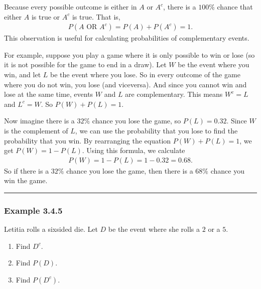 \documentclass[letterpaper,10pt,english]{jupyterBook}
\begin{document}
\sphinxAtStartPar
Because every possible outcome is either in \(A\) or \(A^c\), there is a \(100\%\) chance that either \(A\) is true or \(A^c\) is true. That is,
\begin{equation*}
\begin{split} P(A \text{ OR } A^c) = P(A) + P(A^c) = 1. \end{split}
\end{equation*}
\sphinxAtStartPar
This observation is useful for calculating probabilities of complementary events.

\sphinxAtStartPar
For example, suppose you play a game where it is only possible to win or lose (so it is not possible for the game to end in a draw). Let \(W\) be the event where you win, and let \(L\) be the event where you lose. So in every outcome of the game where you do not win, you lose (and vice\sphinxhyphen{}versa). And since you cannot win and lose at the same time, events \(W\) and \(L\) are complementary. This means \(W^c = L\) and \(L^c = W\). So \(P(W) + P(L) = 1\).

\sphinxAtStartPar
Now imagine there is a \(32\%\) chance you lose the game, so \(P(L) = 0.32\). Since \(W\) is the complement of \(L\), we can use the probability that you lose to find the probability that you win. By rearranging the equation \(P(W) + P(L) = 1\), we get \(P(W) = 1 - P(L)\). Using this formula, we calculate
\begin{equation*}
\begin{split} P(W) = 1 - P(L) = 1 - 0.32 = 0.68. \end{split}
\end{equation*}
\sphinxAtStartPar
So if there is a \(32\%\) chance you lose the game, then there is a \(68\%\) chance you win the game.


\bigskip\hrule\bigskip



\subsubsection{Example 3.4.5}
\label{\detokenize{Ch3 Probability/3.4 Addition Rules and Mutually Exclusive Events:example-3-4-5}}
\sphinxAtStartPar
Letitia rolls a six\sphinxhyphen{}sided die. Let \(D\) be the event where she rolls a \(2\) or a \(5\).
\begin{enumerate}
%
\item {} 
\sphinxAtStartPar
Find \(D^c\).

\item {} 
\sphinxAtStartPar
Find \(P(D)\).

\item {} 
\sphinxAtStartPar
Find \(P(D^c)\).

\end{enumerate}
\end{document}
